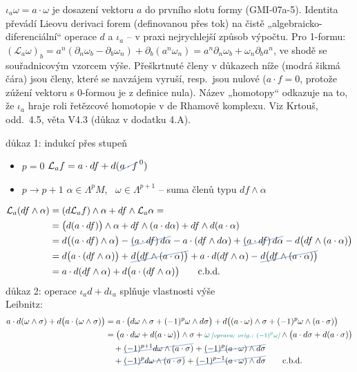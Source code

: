\begin{vysvetleni}
$\iota_a\omega=a\cdot\omega$ je dosazení vektoru $a$ do prvního slotu formy (GMI-07a-5). Identita převádí Lieovu derivaci forem (definovanou přes tok) na čistě „algebraicko-diferenciální“ operace $d$ a $\iota_a$ -- v praxi nejrychlejší způsob výpočtu.
Pro 1-formu: $(\mathcal{L}_a\omega)_b=a^n(\partial_n\omega_b-\partial_b\omega_n)+\partial_b(a^n\omega_n)=a^n\partial_n\omega_b+\omega_n\partial_ba^n$, ve shodě se souřadnicovým vzorcem výše.
Přeškrtnuté členy v důkazech níže (modrá šikmá čára) jsou členy, které se navzájem vyruší, resp.\ jsou nulové ($a\cdot f=0$, protože zúžení vektoru s 0-formou je z definice nula).
Název „homotopy“ odkazuje na to, že $\iota_a$ hraje roli řetězcové homotopie v de Rhamově komplexu. Viz Krtouš, odd.~4.5, věta V4.3 (důkaz v dodatku 4.A).
\end{vysvetleni}
důkaz 1: indukcí přes stupeň
\begin{itemize}[nosep]
  \item[] $p = 0$ \quad $\mathcal{L}_af = a\cdot df + d(\gmIsestBskrt{a\cdot f}^{\,0})$ \quad \checkmark
  \item[] $p\to p+1$ \quad $\alpha\in\Lambda^pM$, \ $\omega\in\Lambda^{p+1}$ -- suma členů typu $df\wedge\alpha$
\end{itemize}
\begin{align*}
  \mathcal{L}_a(df\wedge\alpha) &= (d\mathcal{L}_af)\wedge\alpha + df\wedge\mathcal{L}_a\alpha = \\
  &= \big(d(a\cdot df)\big)\wedge\alpha + df\wedge(a\cdot d\alpha) + df\wedge d(a\cdot\alpha) \\
  &= d\big((a\cdot df)\wedge\alpha\big) - \gmIsestBskrt{(a\cdot df)\,d\alpha} - a\cdot(df\wedge d\alpha)
     + \gmIsestBskrt{(a\cdot df)\,d\alpha} - d\big(df\wedge(a\cdot\alpha)\big) \\
  &= d\big(a\cdot(df\wedge\alpha)\big) + \gmIsestBskrt{d\big(df\wedge(a\cdot\alpha)\big)} + a\cdot d(df\wedge\alpha)
     - \gmIsestBskrt{d\big(df\wedge(a\cdot\alpha)\big)} \\
  &= a\cdot d(df\wedge\alpha) + d\big(a\cdot(df\wedge\alpha)\big) \qquad\text{c.b.d.}
\end{align*}
důkaz 2: operace $\iota_ad + d\iota_a$ splňuje vlastnosti výše \\
Leibnitz:
\begin{align*}
  a\cdot d(\omega\wedge\sigma) + d\big(a\cdot(\omega\wedge\sigma)\big)
  &= a\cdot\big(d\omega\wedge\sigma + (-1)^p\omega\wedge d\sigma\big)
     + d\big((a\cdot\omega)\wedge\sigma + (-1)^p\omega\wedge(a\cdot\sigma)\big) \\
  &= \big(a\cdot d\omega + d(a\cdot\omega)\big)\wedge\sigma + \oprava{\omega}{(-1)^p\omega}\wedge\big(a\cdot d\sigma + d(a\cdot\sigma)\big) \\
  &\quad + \gmIsestBskrt{(-1)^{p+1}d\omega\wedge(a\cdot\sigma)} + \gmIsestBskrt{(-1)^p(a\cdot\omega)\wedge d\sigma} \\
  &\quad + \gmIsestBskrt{(-1)^p d\omega\wedge(a\cdot\sigma)} + \gmIsestBskrt{(-1)^{p-1}(a\cdot\omega)\wedge d\sigma}
     \qquad\text{c.b.d.}
\end{align*}

